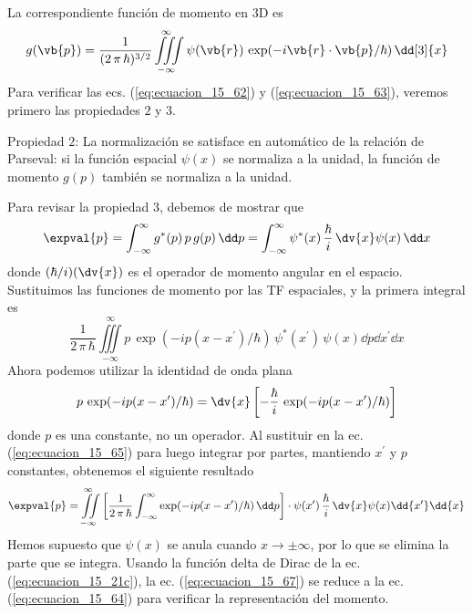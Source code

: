 La correspondiente función de momento en 3D es
\begin{align*}
g (\vb{p}) = \dfrac{1}{(2 \, \pi \, \hbar)^{3/2}} \iiint \limits_{-\infty}^{\infty} \psi (\vb{r}) \, \exp(-i \vb{r} \cdot \vb{p} / \hbar) \, \dd[3]{x}
\end{align*}
Para verificar las ecs. (\ref{eq:ecuacion_15_62}) y (\ref{eq:ecuacion_15_63}), veremos primero las propiedades $2$ y $3$.
\par
Propiedad $2$: La normalización se satisface en automático de la relación de Parseval: si la función espacial $\psi (x)$ se normaliza a la unidad, la función de momento $g(p)$ también se normaliza a la unidad.
\par
Para revisar la propiedad $3$, debemos de mostrar que
\begin{equation}
\expval{p} = \int_{-\infty}^{\infty} g^{*} (p) \, p \, g(p) \, \dd p = \int_{-\infty}^{\infty} \psi^{*} (x) \, \dfrac{\hbar}{i} \, \dv{x} \psi (x) \, \dd x
\label{eq:ecuacion_15_64}
\end{equation}
donde $(\hbar/i)(\dv{x})$ es el operador de momento angular en el espacio. Sustituimos las funciones de momento por las TF espaciales, y la primera integral es
\begin{equation}
\dfrac{1}{2 \,\pi \, \hbar} \iiint \limits_{-\infty}^{\infty} p \, \exp(-i p (x - x^{\prime})/ \hbar) \, \psi^{*}(x^{\prime}) \, \psi (x) \dd{p} \dd{x^{\prime}} \dd{x}
\label{eq:ecuacion_15_65}
\end{equation}
Ahora podemos utilizar la identidad de onda plana
\begin{equation}
p \, \exp(-i p (x - x^{\prime})/ \hbar) = \dv{x} \left[ - \dfrac{\hbar}{i} \, \exp(-i p (x - x^{\prime})/ \hbar) \right]
\label{eq:ecuacion_15_66}
\end{equation}
donde $p$ es una constante, no un operador. Al sustituir en la ec. (\ref{eq:ecuacion_15_65}) para luego integrar por partes, mantiendo $x^{\prime}$ y $p$ constantes, obtenemos el siguiente resultado
\begin{equation}
\expval{p} = \iint \limits_{-\infty}^{\infty} \left[ \dfrac{1}{2 \,\pi \, \hbar} \int_{-\infty}^{\infty} \exp(-i p (x - x^{\prime})/ \hbar) \, \dd p \right] \cdot \psi (x^{\prime}) \, \dfrac{\hbar}{i} \, \dv{x} \psi (x) \dd{x^{\prime}} \dd{x}
\label{eq:ecuacion_15_67}
\end{equation}
Hemos supuesto que $\psi (x)$ se anula cuando $x \to \pm \infty$, por lo que se elimina la parte que se integra. Usando la función delta de Dirac de la ec. (\ref{eq:ecuacion_15_21c}), la ec. (\ref{eq:ecuacion_15_67}) se reduce a la ec. (\ref{eq:ecuacion_15_64}) para verificar la representación del momento.
